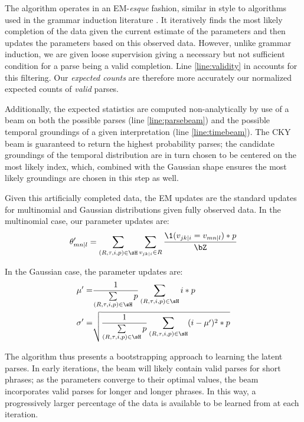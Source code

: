 The algorithm operates in an EM-\textit{esque} fashion, similar in style
	to algorithms used in the grammar induction
	literature \needcite.
It iteratively finds the most
	likely completion of the data given the current estimate of the parameters
	and then updates the parameters based on this observed data.
However, unlike grammar induction, we are given loose supervision giving a 
	necessary but not sufficient condition for a parse being a valid completion.
Line \ref{line:validity} in  accounts for this filtering.
Our \textit{expected counts} are therefore more accurately our normalized
	expected counts of \textit{valid} parses.

Additionally, the expected statistics are computed non-analytically by use of
	a beam on both the possible parses (line \ref{line:parsebeam}) and the
	possible temporal groundings of a given interpretation (line
	\ref{line:timebeam}).
The CKY beam is guaranteed to return the highest probability parses;
	the candidate groundings of the temporal distribution are in turn chosen
	to be centered on the most likely index, which, combined with the Gaussian
	shape ensures the most likely groundings are chosen in this step as well.

Given this artificially completed data, the EM updates are the standard
	updates for multinomial and Gaussian distributions given fully observed data.
In the multinomial case, our parameter updates are:
\begin{equation}
	\theta_{mn \mid l}' =
		\sum\limits_{(R,\tau,i,p) \in \sH} \sum\limits_{v_{jk \mid i} \in R}
		\frac{
			\1(v_{jk \mid i} = v_{mn \mid l}) * p
		}{
			\bZ
		}
\label{eqn:multinomialEM}
\end{equation}

In the Gaussian case, the parameter updates are:
\begin{align}
	\mu' =&
		\frac{ 1 } { \sum\limits_{(R,\tau,i,p) \in \sH}  p }
		\sum\limits_{(R,\tau,i,p) \in \sH} i * p \\
	\sigma' =& \sqrt{
		\frac{ 1 } { \sum\limits_{(R,\tau,i,p) \in \sH}  p }
		\sum\limits_{(R,\tau,i,p) \in \sH} (i-\mu')^2 * p
	}
\label{eqn:multinomialEM}
\end{align}

The algorithm thus presents a bootstrapping approach to learning the latent
	parses.
In early iterations, the beam will likely contain valid parses for short
	phrases;
	as the parameters converge to their optimal values, the beam incorporates
	valid parses for longer and longer phrases.
In this way, a progressively larger percentage of the data is available to be
	learned from at each iteration.

